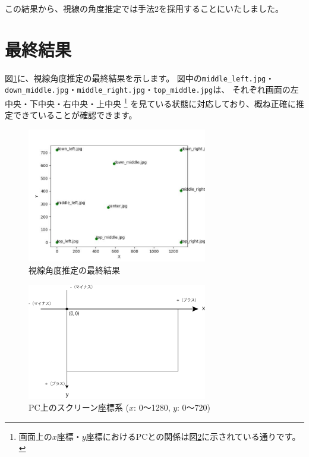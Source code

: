 この結果から、視線の角度推定では手法2を採用することにいたしました。

\section{最終結果}
図\ref{fig:gaze_estimation_success}に、視線角度推定の最終結果を示します。
図中の\texttt{middle\_left.jpg}・\texttt{down\_middle.jpg}・\texttt{middle\_right.jpg}・\texttt{top\_middle.jpg}は、
それぞれ画面の左中央・下中央・右中央・上中央
\footnote{画面上の$x$座標・$y$座標におけるPCとの関係は図\ref{fig:definition_coordinates}に示されている通りです。}
を見ている状態に対応しており、概ね正確に推定できていることが確認できます。

\begin{figure}[htbp]
    \centering
    \includegraphics[width=0.7\textwidth]{eye-track-cursor/fig/gaze_at_result.png}
    \caption{視線角度推定の最終結果}
    \label{fig:gaze_estimation_success}
\end{figure}

\begin{figure}[htbp]
    \centering
    \includegraphics[width=0.7\textwidth]{eye-track-cursor/fig/pc_definition.png}
    \caption{PC上のスクリーン座標系 ($x$: 0～1280, $y$: 0～720)}
    \label{fig:definition_coordinates}
\end{figure}


